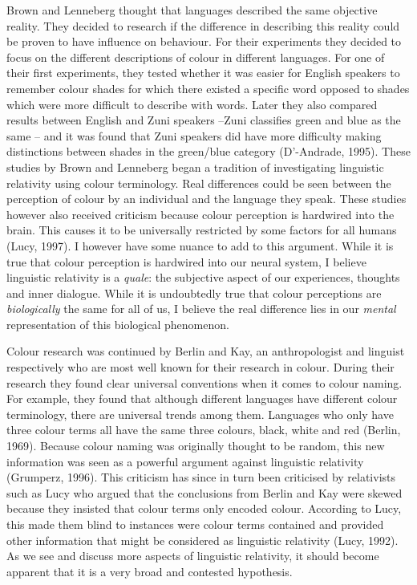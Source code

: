  
\hspace{-0.2cm}Brown and Lenneberg thought that languages described the same objective reality. They decided to research if the difference in describing this reality could be proven to have influence on behaviour. For their experiments they decided to focus on the different descriptions of colour in different languages. For one of their first experiments, they tested whether it was easier for English speakers to remember colour shades for which there existed a specific word opposed to shades which were more difficult to describe with words. Later they also compared results between English and Zuni speakers --Zuni classifies green and blue as the same -- and it was found  that Zuni speakers did have more difficulty making distinctions between shades in the green/blue category (D’-Andrade, 1995). These studies by Brown and Lenneberg began a tradition of investigating linguistic relativity using colour terminology. Real differences could be seen between the perception of colour by an individual and the language they speak. These studies however also received criticism because colour perception is hardwired into the brain. This causes it to be universally restricted by some factors for all humans (Lucy, 1997). I however have some nuance to add to this argument. While it is true that colour perception is hardwired into our neural system, I believe linguistic relativity is a {\it quale}: the subjective aspect of our experiences, thoughts and inner dialogue. While it is undoubtedly true that colour perceptions are \textit{biologically} the same for all of us, I believe the real difference lies in our \textit{mental} representation of this biological phenomenon.  

 
	Colour research was continued by Berlin and Kay, an anthropologist and linguist respectively who are most well known for their research in colour. During their research they found  clear universal conventions when it comes to colour naming. For example, they found  that although different languages have different colour terminology, there are universal trends among them. Languages who only have three colour terms all have the same three colours, black, white and red (Berlin, 1969). Because colour naming was originally thought to be random, this new information was seen as a powerful argument against linguistic relativity (Grumperz, 1996). This criticism has since in turn been criticised by relativists such as Lucy who argued that the conclusions from Berlin and Kay were skewed because they insisted that colour terms only encoded colour. According to Lucy, this made them blind to instances were colour terms contained and provided other information that might be considered as linguistic relativity (Lucy, 1992). As we see and discuss more aspects of linguistic relativity, it should become apparent that it is a very broad and contested hypothesis.  

